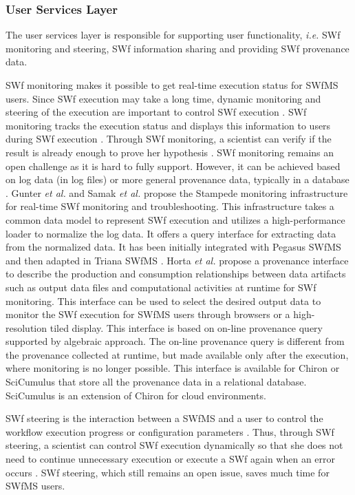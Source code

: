 \subsubsection{User Services Layer}
\label{sec:subsub:USL}

The user services layer is responsible for supporting user functionality, \textit{i.e.} SWf monitoring and steering, SWf information sharing and providing SWf provenance data. 

SWf monitoring makes it possible to get real-time execution status for SWfMS users. 
Since SWf execution may take a long time, dynamic
monitoring and steering of the execution are important to control SWf execution \cite{Deelman2009}. 
SWf monitoring tracks the execution status and displays this information to users during SWf execution \cite{Coalition1999}. 
Through SWf monitoring, a scientist can verify if the result is already enough to prove her hypothesis \cite{Costa2013}. 
SWf monitoring remains an open challenge as it is hard to fully support. 
However, it can be achieved based on log data (in log files) or more general provenance data, typically in a database \cite{Mattoso2014}.
Gunter \textit{et al.} \cite{Gunter2011} and Samak \textit{et al.} \cite{Samak2011} propose
the Stampede monitoring infrastructure for real-time SWf monitoring
and troubleshooting. This infrastructure takes a common data model
to represent SWf execution and utilizes a high-performance
loader to normalize the log data. It offers a query interface for
extracting data from the normalized data. 
It has been initially integrated with Pegasus SWfMS and then adapted in Triana SWfMS \cite{Vahi2012}.
Horta \textit{et al.} \cite{Horta2012} propose a provenance interface to describe 
the production and consumption relationships between data artifacts
such as output data files and computational activities at runtime for SWf monitoring. 
This interface can be used to select the desired output data to monitor the SWf
execution for SWfMS users through browsers or a high-resolution tiled display. 
This interface is based on on-line provenance query supported by algebraic approach.
The on-line provenance query is different from the provenance collected at runtime, 
but made available only after the execution, where monitoring is no longer possible.
This interface is available for Chiron \cite{Ogasawara2013} or SciCumulus \cite{Oliveira2010} that store all the provenance data in a relational database. 
SciCumulus is an extension of Chiron for cloud environments. 

SWf steering is the interaction between a SWfMS and a user to control the workflow execution progress or configuration parameters \cite{Mattoso2014}. Thus, through SWf steering, a scientist can control SWf execution dynamically so that she does not need to continue unnecessary execution or execute a SWf again when an error occurs \cite{Costa2013,A.R.Gonccalves2012}. SWf steering, which still remains an open issue, saves much time for SWfMS  users. 

